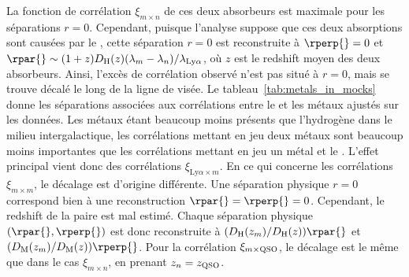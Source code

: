 La fonction de corrélation $\xi_{m \times n}$ de ces deux absorbeurs est maximale pour les séparations $r = 0$.
Cependant, puisque l'analyse suppose que ces deux absorptions sont causées par le \lya{}, cette séparation $r = 0$ est reconstruite à $\rperp{} = 0$ et $\rpar{} \sim (1+z)D_{\mathrm{H}}(z)(\lambda_m - \lambda_{n} ) / \lambda_{\mathrm{Ly}\alpha}$, où $z$ est le redshift moyen des deux absorbeurs.
Ainsi, l'excès de corrélation observé n'est pas situé à $r = 0$, mais se trouve décalé le long de la ligne de visée.
Le tableau~\ref{tab:metals_in_mocks} donne les séparations associées aux corrélations entre le \lya{} et les métaux ajustés sur les données.
Les métaux étant beaucoup moins présents que l'hydrogène dans le milieu intergalactique, les corrélations mettant en jeu deux métaux sont beaucoup moins importantes que les corrélations mettant en jeu un métal et le \lya{}. %
L'effet principal vient donc des corrélations $\xi_{\mathrm{Ly}\alpha \times m}$. %
En ce qui concerne les corrélations $\xi_{m \times m}$, le décalage est d'origine différente. Une séparation physique $r=0$ correspond bien à une reconstruction $\rpar{} = \rperp{} = 0$. Cependant, le redshift de la paire est mal estimé. Chaque séparation physique $(\rpar{}, \rperp{})$ est donc reconstruite à $(D_{\mathrm{H}}(z_m) / D_{\mathrm{H}}(z))\rpar{}$ et $(D_{\mathrm{M}}(z_m)/D_{\mathrm{M}}(z))\rperp{}$.
Pour la corrélation $\xi_{m \times \textsc{QSO}}$, le décalage est le même que dans le cas $\xi_{m\times n}$, en prenant $z_n = z_{\textsc{QSO}}$.


